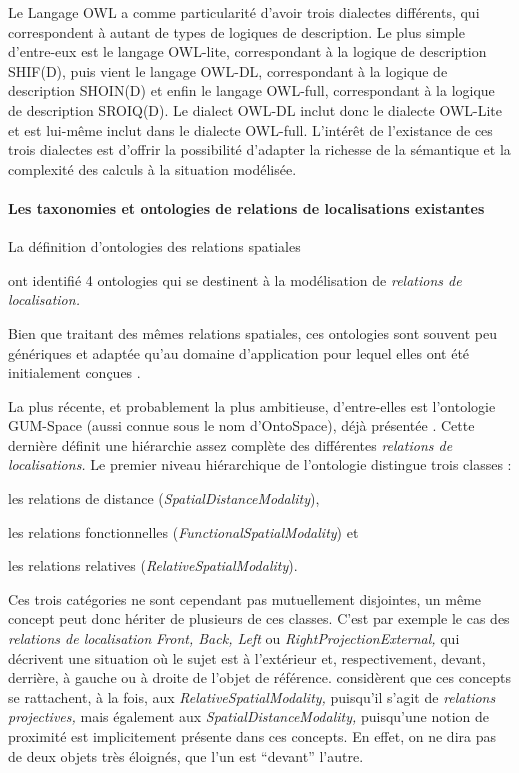 Le Langage OWL a comme particularité d'avoir trois dialectes
différents, qui correspondent à autant de types de logiques de
description. Le plus simple d'entre-eux est le langage OWL-lite,
correspondant à la logique de description SHIF(D), puis vient le
langage OWL-DL, correspondant à la logique de description SHOIN(D) et
enfin le langage OWL-full, correspondant à la logique de description
SROIQ(D). Le dialect OWL-DL inclut donc le dialecte OWL-Lite et est
lui-même inclut dans le dialecte OWL-full. L’intérêt de l'existance de
ces trois dialectes est d’offrir la possibilité d'adapter la richesse
de la sémantique et la complexité des calculs à la situation
modélisée.

\paragraph{Les taxonomies et ontologies de relations de localisations
  existantes}

La définition d'ontologies des relations spatiales

\textcite{Duchene2019} ont identifié 4 ontologies qui se destinent à
la modélisation de \emph{relations de localisation.}

Bien que traitant des mêmes relations spatiales, ces ontologies sont
souvent peu génériques et adaptée qu'au domaine d’application pour
lequel elles ont été initialement conçues \autocite{Hudelot2008a}.

La plus récente, et probablement la plus ambitieuse, d'entre-elles est
l'ontologie GUM-Space (aussi connue sous le nom d'OntoSpace), déjà
présentée \autocite{Bateman2010}.
Cette dernière définit une hiérarchie assez complète des différentes
\emph{relations de localisations.} Le premier niveau hiérarchique de
l'ontologie distingue trois classes :
% 
\begin{enumerate*}
\item les relations de distance (\emph{SpatialDistanceModality}),
\item les relations fonctionnelles
  (\emph{FunctionalSpatialModality}) et
\item les relations relatives (\emph{RelativeSpatialModality}).
\end{enumerate*}
% 
Ces trois catégories ne sont cependant pas mutuellement disjointes, un
même concept peut donc hériter de plusieurs de ces classes. C'est par
exemple le cas des \emph{relations de localisation} \emph{Front, Back,
  Left} ou \emph{RightProjectionExternal,} qui décrivent une situation
où le sujet est à l'extérieur et, respectivement, devant, derrière, à
gauche ou à droite de l'objet de référence. \textcite{Bateman2010}
considèrent que ces concepts se rattachent, à la fois, aux
\emph{RelativeSpatialModality,} puisqu'il s'agit de \emph{relations
  projectives,} mais également aux \emph{SpatialDistanceModality,}
puisqu'une notion de proximité est implicitement présente dans ces
concepts. En effet, on ne dira pas de deux objets très éloignés, que
l'un est \enquote{devant} l'autre.

